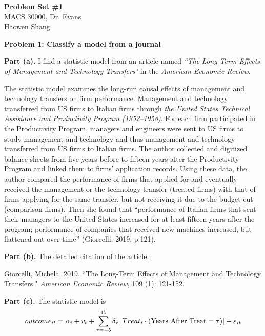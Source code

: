 \documentclass[letterpaper,12pt]{article}
\theoremstyle{definition}
\begin{document}
\begin{flushleft}
  \textbf{\large{Problem Set \#1}} \\
  MACS 30000, Dr. Evans \\
  Haowen Shang
\end{flushleft}

\vspace{5mm}

\noindent\textbf{Problem 1: Classify a model from a journal}

\textbf{Part (a).} I find a statistic model from an article named \emph{``The Long-Term Effects of Management and Technology Transfers"} in the \emph{American Economic Review}.

The statistic model examines the long-run causal effects of management and technology transfers on firm performance. Management and technology transferred from US firms to Italian firms through  \emph{the United States Technical Assistance and Productivity Program (1952–1958)}.  For each firm participated in the Productivity Program, managers and engineers were sent to US firms to study management and technology and thus management and technology transferred from US firms to Italian firms. The author collected and digitized balance sheets from five years before to fifteen years after the Productivity Program and linked them to firms’ application records. Using these data, the author compared the performance of firms that applied for and eventually received the management or the technology transfer (treated firms) with that of firms applying for the same transfer, but not receiving it due to the budget cut (comparison firms). Then she found that ``performance of Italian firms that sent their managers to the United States increased for at least fifteen years after the program; performance of companies that received new machines increased, but flattened out over time'' (Giorcelli, 2019, p.121).

\textbf{Part (b).} The detailed citation of the article:

Giorcelli, Michela. 2019. ``The Long-Term Effects of Management and Technology Transfers." \emph{American Economic Review}, 109 (1): 121-152.

\textbf{Part (c).} The statistic model is 
\begin{equation*}
 outcome_{it} = \alpha_{i} + v_{t} + \sum_{\tau =-5}^{15} \delta_{\tau }\left [ Treat_{i} \cdot \left ( \textup{Years After Treat} = \tau  \right ) \right ] + \varepsilon_{it}
\end{equation*}
\end{document}
